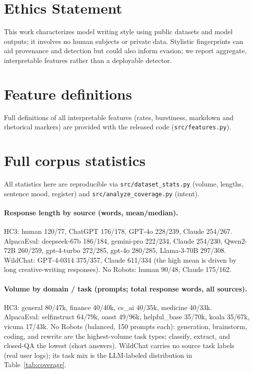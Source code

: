 \documentclass[11pt]{article}
\begin{document}
\section*{Ethics Statement}
This work characterizes model writing style using public datasets and model
outputs; it involves no human subjects or private data. Stylistic fingerprints
can aid provenance and detection but could also inform evasion; we report
aggregate, interpretable features rather than a deployable detector.



\appendix

\section{Feature definitions}
\label{app:features}
Full definitions of all interpretable features (rates, burstiness, markdown and
rhetorical markers) are provided with the released code (\texttt{src/features.py}).

\section{Full corpus statistics}
\label{app:stats}
All statistics here are reproducible via \texttt{src/dataset\_stats.py} (volume,
lengths, sentence mood, register) and \texttt{src/analyze\_coverage.py} (intent).

\paragraph{Response length by source (words, mean/median).}
HC3: human 120/77, ChatGPT 176/178, GPT-4o 228/239, Claude 254/267. AlpacaEval:
deepseek-67b 186/184, gemini-pro 222/234, Claude 254/230, Qwen2-72B 260/259,
gpt-4-turbo 272/285, gpt-4o 280/285, Llama-3-70B 297/308. WildChat: GPT-4-0314
375/357, Claude 611/334 (the high mean is driven by long creative-writing
responses). No Robots: human 90/48, Claude 175/162.

\paragraph{Volume by domain / task (prompts; total response words, all sources).}
HC3: general 80/47k, finance 40/40k, cs\_ai 40/35k, medicine 40/33k. AlpacaEval:
selfinstruct 64/79k, oasst 49/96k, helpful\_base 35/70k, koala 35/67k, vicuna
17/43k. No Robots (balanced, 150 prompts each): generation, brainstorm, coding,
and rewrite are the highest-volume task types; classify, extract, and closed-QA
the lowest (short answers). WildChat carries no source task labels (real user
logs); its task mix is the LLM-labeled distribution in Table~\ref{tab:coverage}.
\end{document}
